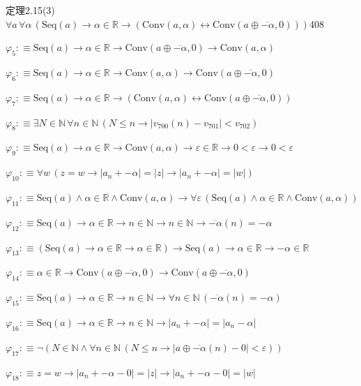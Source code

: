 \begin{fullproof}{定理2.15(3)}{$\forall a\,\forall \alpha\,(\mathrm{Seq}(a) \to \alpha \in \mathbb{R} \to (\mathrm{Conv}(a,\alpha) \leftrightarrow \mathrm{Conv}(a \oplus \overline{-\alpha},0)))$}{408}
\begin{abbrevlist}
\item $\varphi_{5} :\equiv \mathrm{Seq}(a) \to \alpha \in \mathbb{R} \to \mathrm{Conv}(a \oplus \overline{-\alpha},0) \to \mathrm{Conv}(a,\alpha)$
\item $\varphi_{6} :\equiv \mathrm{Seq}(a) \to \alpha \in \mathbb{R} \to \mathrm{Conv}(a,\alpha) \to \mathrm{Conv}(a \oplus \overline{-\alpha},0)$
\item $\varphi_{7} :\equiv \mathrm{Seq}(a) \to \alpha \in \mathbb{R} \to (\mathrm{Conv}(a,\alpha) \leftrightarrow \mathrm{Conv}(a \oplus \overline{-\alpha},0))$
\item $\varphi_{8} :\equiv \exists N \in \mathbb{N}\,\forall n \in \mathbb{N}\,(N \leq n \to \lvert v_{700}(n) - v_{701} \rvert < v_{702})$
\item $\varphi_{9} :\equiv \mathrm{Seq}(a) \to \alpha \in \mathbb{R} \to \mathrm{Conv}(a,\alpha) \to \varepsilon \in \mathbb{R} \to 0 < \varepsilon \to 0 < \varepsilon$
\item $\varphi_{10} :\equiv \forall w\,(z = w \to \lvert a_{n} + -\alpha \rvert = \lvert z \rvert \to \lvert a_{n} + -\alpha \rvert = \lvert w \rvert)$
\item $\varphi_{11} :\equiv \mathrm{Seq}(a) \land \alpha \in \mathbb{R} \land \mathrm{Conv}(a,\alpha) \to \forall \varepsilon\,(\mathrm{Seq}(a) \land \alpha \in \mathbb{R} \land \mathrm{Conv}(a,\alpha))$
\item $\varphi_{12} :\equiv \mathrm{Seq}(a) \to \alpha \in \mathbb{R} \to n \in \mathbb{N} \to n \in \mathbb{N} \to \overline{-\alpha}(n) = -\alpha$
\item $\varphi_{13} :\equiv (\mathrm{Seq}(a) \to \alpha \in \mathbb{R} \to \alpha \in \mathbb{R}) \to \mathrm{Seq}(a) \to \alpha \in \mathbb{R} \to -\alpha \in \mathbb{R}$
\item $\varphi_{14} :\equiv \alpha \in \mathbb{R} \to \mathrm{Conv}(a \oplus \overline{-\alpha},0) \to \mathrm{Conv}(a \oplus \overline{-\alpha},0)$
\item $\varphi_{15} :\equiv \mathrm{Seq}(a) \to \alpha \in \mathbb{R} \to n \in \mathbb{N} \to \forall n \in \mathbb{N}\,(\overline{-\alpha}(n) = -\alpha)$
\item $\varphi_{16} :\equiv \mathrm{Seq}(a) \to \alpha \in \mathbb{R} \to n \in \mathbb{N} \to \lvert a_{n} + -\alpha \rvert = \lvert a_{n} - \alpha \rvert$
\item $\varphi_{17} :\equiv \neg (N \in \mathbb{N} \land \forall n \in \mathbb{N}\,(N \leq n \to \lvert a \oplus \overline{-\alpha}(n) - 0 \rvert < \varepsilon))$
\item $\varphi_{18} :\equiv z = w \to \lvert a_{n} + -\alpha - 0 \rvert = \lvert z \rvert \to \lvert a_{n} + -\alpha - 0 \rvert = \lvert w \rvert$

\end{abbrevlist}
\end{fullproof}
